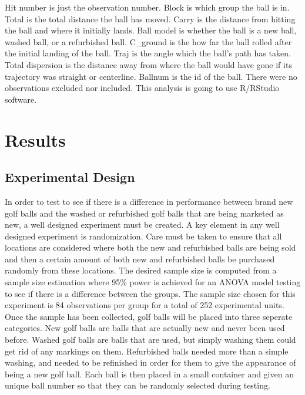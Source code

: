 \documentclass{article}\usepackage[]{graphicx}\usepackage[]{color}
\begin{document}
Hit number is just the observation number. Block is which group the ball is in. Total is the total distance the ball has moved. Carry is the distance from hitting the ball and where it initially lands. Ball model is whether the ball is a new ball, washed ball, or a refurbished ball. C\_ground is the how far the ball rolled after the initial landing of the ball. Traj is the angle which the ball's path has taken. Total dispersion is the distance away from where the ball would have gone if its trajectory was straight or centerline. Ballnum is the id of the ball. 
There were no observations excluded nor included. This analysis is going to use R/RStudio software.

\section*{Results}
\subsection*{Experimental Design}

In order to test to see if there is a difference in performance between brand new golf balls and the washed or refurbished golf balls that are being marketed as new, a well designed experiment must be created. A key element in any well designed experiment is randomization. Care must be taken to ensure that all locations are considered where both the new and refurbished balls are being sold and then a certain amount of both new and refurbished balls be purchased randomly from these locations. The desired sample size is computed from a sample size estimation where 95\% power is achieved for an ANOVA model testing to see if there is a difference between the groups. The sample size chosen for this experiment is 84 observations per group for a total of 252 experimental units. Once the sample has been collected, golf balls will be placed into three seperate categories. New golf balls are balls that are actually new and never been used before. Washed golf balls are balls that are used, but simply washing them could get rid of any markings on them. Refurbished balls needed more than a simple washing, and needed to be refinished in order for them to give the appearance of being a new golf ball. Each ball is then placed in a small container and given an unique ball number so that they can be randomly selected during testing.
\end{document}
